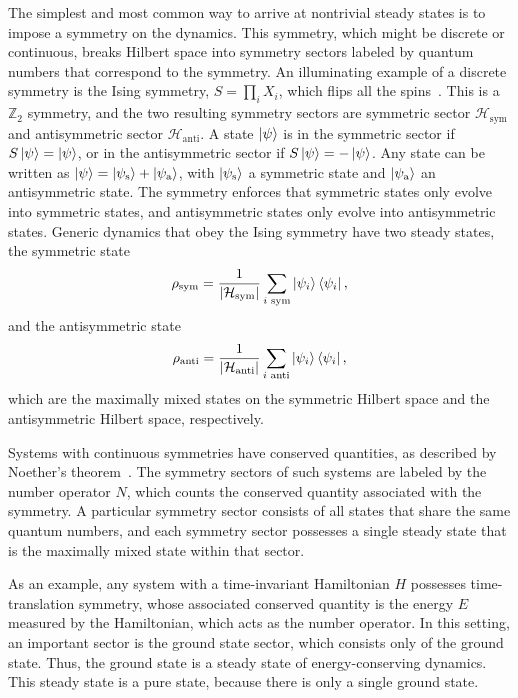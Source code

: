 The simplest and most common way to arrive at nontrivial steady states is to impose a symmetry on the dynamics. This symmetry, which might be discrete or continuous, breaks Hilbert space into symmetry sectors labeled by quantum numbers that correspond to the symmetry. An illuminating example of a discrete symmetry is the Ising symmetry, $S = \prod_i X_i$, which flips all the spins~\cite{Ising1925Contribution}. This is a $\mathbb{Z}_2$ symmetry, and the two resulting symmetry sectors are symmetric sector $\mathcal{H}_\text{sym}$ and antisymmetric sector $\mathcal{H}_\text{anti}$. A state $\ket{\psi}$ is in the symmetric sector if $S\ket{\psi} = \ket{\psi}$, or in the antisymmetric sector if $S\ket{\psi} = -\ket{\psi}$. Any state can be written as $\ket{\psi} = \ket{\psi_\text{s}} + \ket{\psi_\text{a}}$, with $\ket{\psi_\text{s}}$ a symmetric state and $\ket{\psi_\text{a}}$ an antisymmetric state. The symmetry enforces that symmetric states only evolve into symmetric states, and antisymmetric states only evolve into antisymmetric states.
Generic dynamics that obey the Ising symmetry have two steady states, the symmetric state 
\begin{equation}
\rho_\text{sym} = \frac{1}{|\mathcal{H}_\text{sym}|} \sum_{i \text{ sym}} \ket{\psi_i} \bra{\psi_i},
\end{equation}
and the antisymmetric state
\begin{equation}
\rho_\text{anti} = \frac{1}{|\mathcal{H}_\text{anti}|} \sum_{i \text{ anti}} \ket{\psi_i} \bra{\psi_i},
\end{equation}
which are the maximally mixed states on the symmetric Hilbert space and the antisymmetric Hilbert space, respectively.

Systems with continuous symmetries have conserved quantities, as described by Noether's theorem~\cite{Noether1918Theorem}. The symmetry sectors of such systems are labeled by the number operator $N$, which counts the conserved quantity associated with the symmetry. A particular symmetry sector consists of all states that share the same quantum numbers, and each symmetry sector possesses a single steady state that is the maximally mixed state within that sector.

As an example, any system with a time-invariant Hamiltonian $H$ possesses time-translation symmetry, whose associated conserved quantity is the energy $E$ measured by the Hamiltonian, which acts as the number operator. In this setting, an important sector is the ground state sector, which consists only of the ground state. Thus, the ground state is a steady state of energy-conserving dynamics. This steady state is a pure state, because there is only a single ground state.

